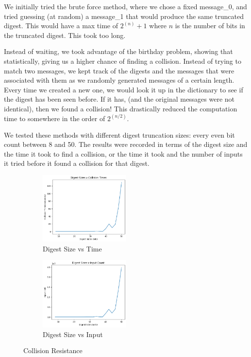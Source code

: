 \documentclass[11pt]{article}
\begin{document}
We initially tried the brute force method, where we chose a fixed message\_0, and tried guessing (at random) a message\_1 that would produce the same truncated digest. This would have a max time of $2^{(n)}+1$ where $n$ is the number of bits in the truncated digest. This took too long. 

Instead of waiting, we took advantage of the birthday problem, showing that statistically, giving us a higher chance of finding a collision. Instead of trying to match two messages, we kept track of the digests and the messages that were associated with them as we randomly generated messages of a certain length. Every time we created a new one, we would look it up in the dictionary to see if the digest has been seen before. If it has, (and the original messages were not identical), then we found a collision! This drastically reduced the computation time to somewhere in the order of $2^{(n/2)}$.

We tested these methods with different digest truncation sizes: every even bit count between 8 and 50. The results were recorded in terms of the digest size and the time it took to find a collision, or the time it took and the number of inputs it tried before it found a collision for that digest.

\begin{figure}[!ht]
	\centering
	\begin{subfigure}{1.00\textwidth}
		\centering
		\includegraphics[width=0.5\textwidth]{./assets/digest_sizes_v_collision_times.png}
		\caption{Digest Size vs Time}
		\label{fig:collision_times}
	\end{subfigure}
	\begin{subfigure}{1.00\textwidth}
		\centering
		\includegraphics[width=0.5\textwidth]{./assets/digest_sizes_v_imput_count.png}
		\caption{Digest Size vs Input}
		\label{fig:collision_inputs}
	\end{subfigure}
	\caption{Collision Resistance}
	\label{fig:collision_performance}
\end{figure}
\end{document}
